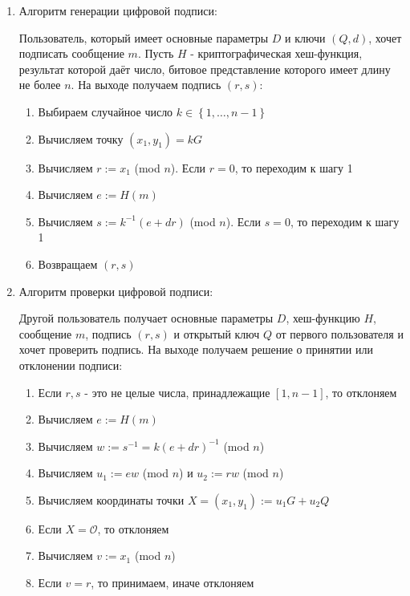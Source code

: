 \begin{enumerate}
      \item Алгоритм генерации цифровой подписи:

      Пользователь, который имеет основные параметры $D$ и ключи $(Q,d)$, хочет подписать сообщение $m$. Пусть $H$ - криптографическая хеш-функция, результат которой даёт число, битовое представление которого имеет длину не более $n$. На выходе получаем подпись $(r,s)$:

      \begin{enumerate}
        \item Выбираем случайное число $k\in \left\{1,\dots,n-1\right\}$
        \item Вычисляем точку $(x_1,y_1)= kG$
        \item Вычисляем $r := x_1$ (mod $n$). Если $r=0$, то переходим к шагу 1
        \item Вычисляем $e := H(m)$
        \item Вычисляем $s := k^{-1}(e+dr)$ (mod $n$). Если $s=0$, то переходим к шагу 1
        \item Возвращаем $(r,s)$
      \end{enumerate}

      \item Алгоритм проверки цифровой подписи:

      Другой пользователь получает основные параметры $D$, хеш-функцию $H$, сообщение $m$, подпись $(r,s)$ и открытый ключ $Q$ от первого пользователя и хочет проверить подпись. На выходе получаем решение о принятии или отклонении подписи:

      \begin{enumerate}
        \item Если $r,s$ - это не целые числа, принадлежащие $[1,n-1]$, то отклоняем
        \item Вычисляем $e:=H(m)$
        \item Вычисляем $w := s^{-1} = k(e+dr)^{-1}$ (mod $n$) 
        \item Вычисляем $u_1:=ew$ (mod $n$) и $u_2:=rw$ (mod $n$)
        \item Вычисляем координаты точки $X=(x_1,y_1):=u_1G+u_2Q$
        \item Если $X=\mathcal{O}$, то отклоняем
        \item Вычисляем $v:=x_1$ (mod $n$)
        \item Если $v = r$, то принимаем, иначе отклоняем
      \end{enumerate}
    \end{enumerate}

